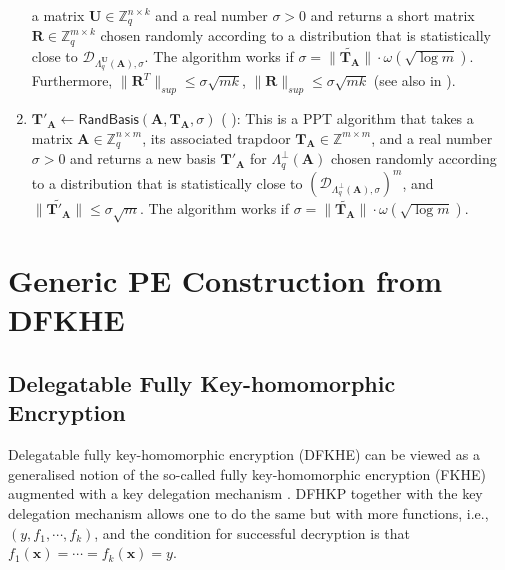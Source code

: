 \documentclass[runningheads,10pt]{llncs}
\begin{document}
\begin{lemma}
\begin{enumerate}
		a matrix $\mathbf{U} \in \mathbb{Z}_q^{n\times k}$ and a real number $\sigma>0$ and returns a
		short matrix $\mathbf{R} \in \mathbb{Z}_q^{m \times k} $ chosen randomly according to a distribution 
		that is statistically close to $\mathcal{D}_{\Lambda^{\mathbf{U}}_q(\mathbf{A}),\sigma}$.
		The algorithm works if $\sigma=\| \widetilde{\mathbf{T}_\mathbf{A}}\|\cdot \omega(\sqrt{\log m})$. Furthermore, $\|\textbf{R}^T\|_{sup} \leq \sigma\sqrt{mk}$, $\|\textbf{R}\|_{sup} \leq \sigma\sqrt{mk}$ (see also in \cite[Lemma 2.5]{BGG+14}).
		 \item $\mathbf{T}'_\mathbf{A} \leftarrow\mathsf{RandBasis}(\mathbf{A},\mathbf{T}_\mathbf{A}, \sigma)$ ( \cite{CHKP10}): 
		This is a PPT algorithm that takes 
		a matrix $\mathbf{A} \in \mathbb{Z}_q^{n \times m}$,  
		its associated  trapdoor $\mathbf{T}_\mathbf{A} \in \mathbb{Z}^{m \times m}$, and a real number $\sigma>0$ 
		and returns a new basis  $\mathbf{T}'_\mathbf{A}$ for $\Lambda^{\bot}_q(\mathbf{A})$ chosen randomly according to a distribution 
		that is statistically close to $(\mathcal{D}_{\Lambda^{\bot}_q(\mathbf{A}),\sigma})^m$, and  $\| \widetilde{\mathbf{T}'_\mathbf{A}}\| \leq \sigma\sqrt{m}$.
		The algorithm works if $\sigma=\| \widetilde{\mathbf{T}_\mathbf{A}}\|\cdot \omega(\sqrt{\log m})$.
	\end{enumerate}
\end{lemma}

\section{Generic PE Construction from DFKHE} \label{generic}

\subsection{Delegatable Fully Key-homomorphic Encryption}

Delegatable fully key-homomorphic encryption (DFKHE) can be viewed as a generalised notion of 
the so-called fully key-homomorphic encryption (FKHE) \cite{BGG+14} augmented with a key delegation mechanism \cite{BGG+14}. DFHKP together with the key delegation mechanism allows one to do the same
but with  more functions, i.e., $(y, f_1, \cdots, f_k)$, and the condition for successful decryption is that $f_1(\mathbf{x})=\cdots=f_k(\mathbf{x})=y$.
\end{document}

